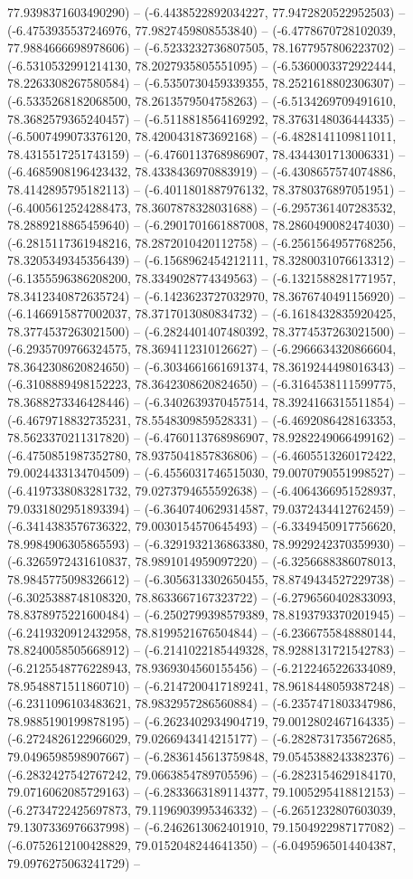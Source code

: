 77.9398371603490290) -- (-6.4438522892034227, 77.9472820522952503) -- (-6.4753935537246976, 77.9827459808553840) -- (-6.4778670728102039, 77.9884666698978606) -- (-6.5233232736807505, 78.1677957806223702) -- (-6.5310532991214130, 78.2027935805551095) -- (-6.5360003372922444, 78.2263308267580584) -- (-6.5350730459339355, 78.2521618802306307) -- (-6.5335268182068500, 78.2613579504758263) -- (-6.5134269709491610, 78.3682579365240457) -- (-6.5118818564169292, 78.3763148036444335) -- (-6.5007499073376120, 78.4200431873692168) -- (-6.4828141109811011, 78.4315517251743159) -- (-6.4760113768986907, 78.4344301713006331) -- (-6.4685908196423432, 78.4338436970883919) -- (-6.4308657574074886, 78.4142895795182113) -- (-6.4011801887976132, 78.3780376897051951) -- (-6.4005612524288473, 78.3607878328031688) -- (-6.2957361407283532, 78.2889218865459640) -- (-6.2901701661887008, 78.2860490082474030) -- (-6.2815117361948216, 78.2872010420112758) -- (-6.2561564957768256, 78.3205349345356439) -- (-6.1568962454212111, 78.3280031076613312) -- (-6.1355596386208200, 78.3349028774349563) -- (-6.1321588281771957, 78.3412340872635724) -- (-6.1423623727032970, 78.3676740491156920) -- (-6.1466915877002037, 78.3717013080834732) -- (-6.1618432835920425, 78.3774537263021500) -- (-6.2824401407480392, 78.3774537263021500) -- (-6.2935709766324575, 78.3694112310126627) -- (-6.2966634320866604, 78.3642308620824650) -- (-6.3034661661691374, 78.3619244498016343) -- (-6.3108889498152223, 78.3642308620824650) -- (-6.3164538111599775, 78.3688273346428446) -- (-6.3402639370457514, 78.3924166315511854) -- (-6.4679718832735231, 78.5548309859528331) -- (-6.4692086428163353, 78.5623370211317820) -- (-6.4760113768986907, 78.9282249066499162) -- (-6.4750851987352780, 78.9375041857836806) -- (-6.4605513260172422, 79.0024433134704509) -- (-6.4556031746515030, 79.0070790551998527) -- (-6.4197338083281732, 79.0273794655592638) -- (-6.4064366951528937, 79.0331802951893394) -- (-6.3640740629314587, 79.0372434412762459) -- (-6.3414383576736322, 79.0030154570645493) -- (-6.3349450917756620, 78.9984906305865593) -- (-6.3291932136863380, 78.9929242370359930) -- (-6.3265972431610837, 78.9891014959097220) -- (-6.3256688386078013, 78.9845775098326612) -- (-6.3056313302650455, 78.8749434527229738) -- (-6.3025388748108320, 78.8633667167323722) -- (-6.2796560402833093, 78.8378975221600484) -- (-6.2502799398579389, 78.8193793370201945) -- (-6.2419320912432958, 78.8199521676504844) -- (-6.2366755848880144, 78.8240058505668912) -- (-6.2141022185449328, 78.9288131721542783) -- (-6.2125548776228943, 78.9369304560155456) -- (-6.2122465226334089, 78.9548871511860710) -- (-6.2147200417189241, 78.9618448059387248) -- (-6.2311096103483621, 78.9832957286560884) -- (-6.2357471803347986, 78.9885190199878195) -- (-6.2623402934904719, 79.0012802467164335) -- (-6.2724826122966029, 79.0266943414215177) -- (-6.2828731735672685, 79.0496598598907667) -- (-6.2836145613759848, 79.0545388243382376) -- (-6.2832427542767242, 79.0663854789705596) -- (-6.2823154629184170, 79.0716062085729163) -- (-6.2833663189114377, 79.1005295418812153) -- (-6.2734722425697873, 79.1196903995346332) -- (-6.2651232807603039, 79.1307336976637998) -- (-6.2462613062401910, 79.1504922987177082) -- (-6.0752612100428829, 79.0152048244641350) -- (-6.0495965014404387, 79.0976275063241729) -- 